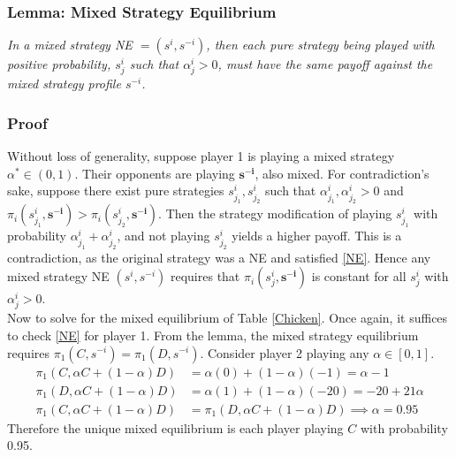 \subsubsection{Lemma: Mixed Strategy Equilibrium}
\emph{In a mixed strategy NE $ = (s^i,s^{-i})$, then each pure strategy being played with positive probability, $s_j^i$ such that $\alpha_j^i>0$, must have the same payoff against the mixed strategy profile $s^{-i}$.  }
\subsubsection{Proof}
 Without loss of generality, suppose player 1 is playing a mixed strategy $\alpha^* \in (0,1)$. Their opponents are playing $\mathbf{s^{-i}}$, also mixed. For contradiction's sake, suppose there exist pure strategies $s_{j_1}^i, s_{j_2}^i$ such that $\alpha_{j_1}^i, \alpha_{j_2}^i >0$ and $\pi_i(s_{j_1}^i,\mathbf{s^{-i}}) > \pi_i(s_{j_2}^i,\mathbf{s^{-i}})$. Then the strategy modification of playing $s_{j_1}^i$ with probability $\alpha_{j_1}^i + \alpha_{j_2}^i$, and not playing $s_{j_2}^i$ yields a higher payoff. This is a contradiction, as the original strategy was a NE and satisfied \eqref{NE}. Hence any mixed strategy NE $(s^i,s^{-i})$ requires that $\pi_i(s_j^i, \mathbf{s^{-i}})$ is constant for all $s_j^i$ with $\alpha_j^i>0$. \halmos \\

Now to solve for the mixed equilibrium of Table \ref{Chicken}. Once again, it suffices to check \eqref{NE} for player 1. From the lemma, the mixed strategy equilibrium requires $\pi_1(C,s^{-i}) = \pi_1(D,s^{-i})$. 
Consider player 2 playing any $\alpha \in [0,1]$. \\
\begin{align*}
    \pi_1(C,\alpha C + (1-\alpha)D) &= \alpha (0) + (1-\alpha)(-1) = \alpha -1 \\
    \pi_1(D,\alpha C + (1-\alpha)D) &= \alpha (1) + (1-\alpha)(-20) = -20 + 21\alpha\\
    \pi_1(C,\alpha C + (1-\alpha)D) &= \pi_1(D,\alpha C
    + (1-\alpha)D) \implies \alpha = 0.95
\end{align*}
Therefore the unique mixed equilibrium is each player playing $C$ with probability 0.95. \\


